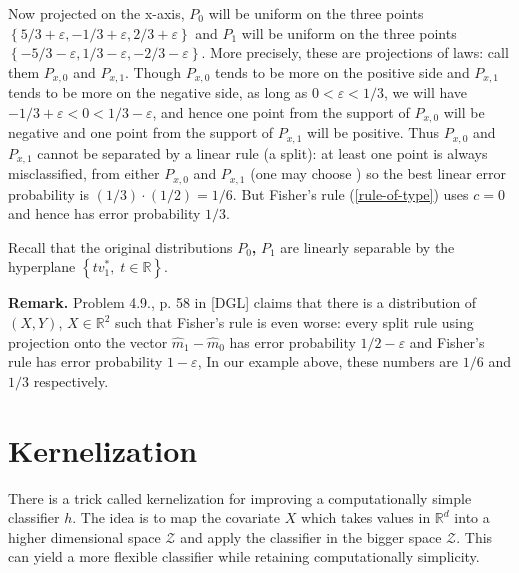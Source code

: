 \documentclass[11pt,twoside]{article}%
\theoremstyle{change}
\begin{document}
Now projected on the x-axis, $P_{0}$ will be uniform on the three points
$\left\{  5/3+\varepsilon,-1/3+\varepsilon,2/3+\varepsilon\right\}  $ and
$P_{1}$ will be uniform on the three points $\left\{  -5/3-\varepsilon
,1/3-\varepsilon,-2/3-\varepsilon\right\}  $. More precisely, these are
projections of laws: call them $P_{x,0}$ and $P_{x,1}$. Though $P_{x,0}$ tends
to be more on the positive side and $P_{x,1}$ tends to be more on the negative
side, as long as $0<\varepsilon<1/3$, we will have $-1/3+\varepsilon
<0<1/3-\varepsilon$, and hence one point from the support of $P_{x,0}$ will be
negative and one point from the support of $P_{x,1}$ will be positive. Thus
$P_{x,0}$ and $P_{x,1}$ cannot be separated by a linear rule (a split): at
least one point is always misclassified, from either $P_{x,0}$ and $P_{x,1}$
(one may choose ) so the best linear error probability is $\left(  1/3\right)
\cdot\left(  1/2\right)  =1/6$. But Fisher's rule (\ref{rule-of-type}) uses
$c=0$ and hence has error probability $1/3$.

Recall that the original distributions $P_{0}$\textbf{, }$P_{1}$ are linearly
separable by the hyperplane $\left\{  tv_{1}^{\ast},\;t\in\mathbb{R}\right\}
$.

\bigskip

\textbf{Remark.} Problem 4.9., p. 58 in [DGL] claims that there is a
distribution of $(X,Y)$, $X\in\mathbb{R}^{2}$ such that Fisher's rule is even
worse: every split rule using projection onto the vector $\hat{m}_{1}-\hat
{m}_{0}$ has error probability $1/2-\varepsilon$ and Fisher's rule has error
probability $1-\varepsilon$, In our example above, these numbers are $1/6$ and
$1/3$ respectively.\pagebreak

\section{Kernelization}

There is a trick called kernelization for improving a computationally simple
classifier $h$. The idea is to map the covariate $X$ which takes values in
$\mathbb{R}^{d}$ into a higher dimensional space $\mathcal{Z}$ and apply the
classifier in the bigger space $\mathcal{Z}$. This can yield a more flexible
classifier while retaining computationally simplicity.
\end{document}
